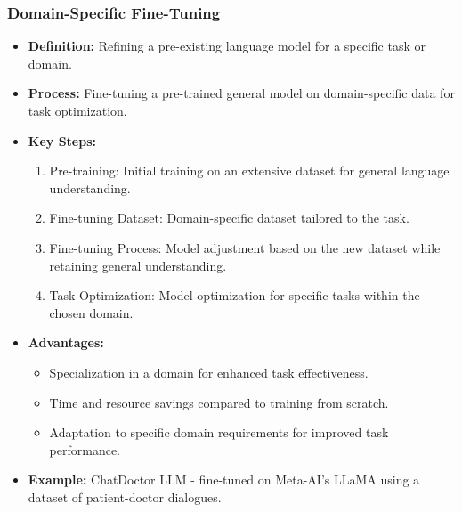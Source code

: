 \begin{frame}[fragile]\frametitle{Domain-Specific Fine-Tuning}
  \begin{itemize}
    \item \textbf{Definition:} Refining a pre-existing language model for a specific task or domain.
    \item \textbf{Process:} Fine-tuning a pre-trained general model on domain-specific data for task optimization.
    \item \textbf{Key Steps:}
      \begin{enumerate}
        \item Pre-training: Initial training on an extensive dataset for general language understanding.
        \item Fine-tuning Dataset: Domain-specific dataset tailored to the task.
        \item Fine-tuning Process: Model adjustment based on the new dataset while retaining general understanding.
        \item Task Optimization: Model optimization for specific tasks within the chosen domain.
      \end{enumerate}
    \item \textbf{Advantages:}
      \begin{itemize}
        \item Specialization in a domain for enhanced task effectiveness.
        \item Time and resource savings compared to training from scratch.
        \item Adaptation to specific domain requirements for improved task performance.
      \end{itemize}
    \item \textbf{Example:} ChatDoctor LLM - fine-tuned on Meta-AI's LLaMA using a dataset of patient-doctor dialogues.
  \end{itemize}
\end{frame}

